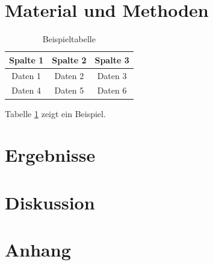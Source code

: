 \documentclass[a4paper,12pt,twoside]{article}
\begin{document}
	
	\newpage
	\section{Material und Methoden}
	\begin{table}[ht]
		\centering
		\begin{tabular}{|c|c|c|}
			\hline
			Spalte 1 & Spalte 2 & Spalte 3 \\ \hline
			Daten 1  & Daten 2  & Daten 3  \\ \hline
			Daten 4  & Daten 5  & Daten 6  \\ \hline
		\end{tabular}
		\caption{Beispieltabelle}
		\label{tab:beispiel}
	\end{table}
	
	Tabelle \ref{tab:beispiel} zeigt ein Beispiel.
	
	
	
	\newpage
	\section{Ergebnisse}
	
	\newpage
	\section{Diskussion}
	
	
	\newpage
	\pagestyle{plain} %
	\printbibliography
	
	
	\newpage
	\pagestyle{plain} %
	\listoffigures
	
	
	\newpage
	\pagestyle{plain} %
	\listoftables
	
	
	\newpage
	\appendix
	\pagestyle{appendix}   %
	\section*{Anhang}
	\renewcommand{\thesubsection}{Anhang \Alph{subsection}}
	
	
\end{document}

